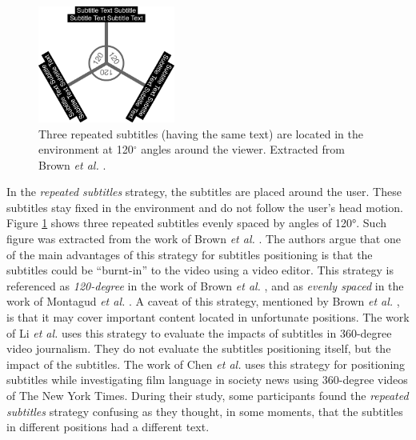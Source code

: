\begin{figure}[!ht]
    \centering
    \includegraphics[width=0.4\textwidth]{img/video360/120_subtitles.png}
    \caption{Three repeated subtitles (having the same text) are located in the environment at 120$^{\circ}$ angles around the viewer. Extracted from Brown \emph{et al.} \cite{brown_subtitles_2017}.}
    \label{fig:120_subtitles}
\end{figure}

In the \emph{repeated subtitles} strategy, the subtitles are placed around the user. These subtitles stay fixed in the environment and do not follow the user's head motion. Figure \ref{fig:120_subtitles} shows three repeated subtitles evenly spaced by angles of 120°. Such figure was extracted from the work of Brown \emph{et al.} \cite{brown_subtitles_2017}. The authors argue that one of the main advantages of this strategy for subtitles positioning is that the subtitles could be ``burnt-in'' to the video using a video editor. This strategy is referenced as \emph{120-degree} in the work of Brown \emph{et al.} \cite{brown_subtitles_2017}, and as \emph{evenly spaced} in the work of Montagud \emph{et al.} \cite{montagud_culture_2020}. A caveat of this strategy, mentioned by Brown \emph{et al.} \cite{brown_subtitles_2017}, is that it may cover important content located in unfortunate positions. 
The work of Li \emph{et al.} \cite{li_impacts_2018} uses this strategy to evaluate the impacts of subtitles in 360-degree video journalism. They do not evaluate the subtitles positioning itself, but the impact of the subtitles. The work of Chen \emph{et al.} \cite{chen_film_2017} uses this strategy for positioning subtitles while investigating film language in society news using 360-degree videos of The New York Times. During their study, some participants found the \emph{repeated subtitles} strategy confusing as they thought, in some moments, that the subtitles in different positions had a different text.


